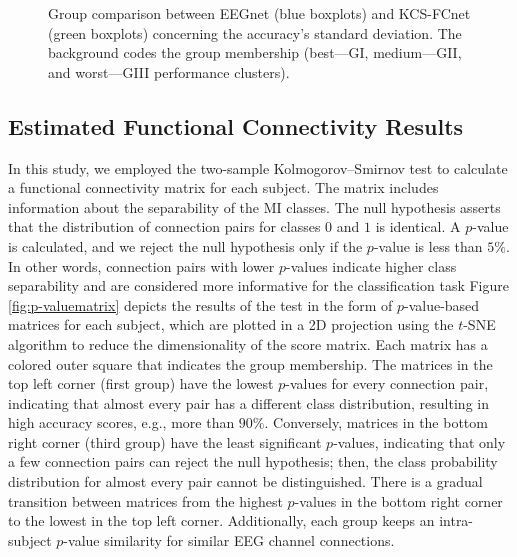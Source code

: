 \begin{figure}[h!]
    \centering
    \resizebox{0.8\linewidth}{!}{}
    \caption{Group comparison between EEGnet (blue boxplots) and KCS-FCnet (green boxplots) concerning the accuracy's standard deviation. The background codes the group membership (best---GI, medium---GII, and worst---GIII performance clusters).}\label{fig:stdcompeeggfc}
\end{figure}

\subsection{Estimated Functional Connectivity Results}
	
In this study, we employed the two-sample Kolmogorov--Smirnov test to calculate a functional connectivity matrix for each subject. The matrix includes information about the separability of the MI classes. The null hypothesis asserts that the distribution of connection pairs for classes $0$ and $1$ is identical. A $p$-value is calculated, and we reject the null hypothesis only if the $p$-value is less than $5\%$. In other words, connection pairs with lower $p$-values indicate higher class separability and are considered more informative for the classification task Figure \ref{fig:p-valuematrix} depicts the results of the test in the form of $p$-value-based matrices for each subject, which are plotted in a 2D projection using the $t$-SNE algorithm to reduce the dimensionality of the score matrix. Each matrix has a colored outer square that indicates the group membership. The matrices in the top left corner (first group) have the lowest $p$-values for every connection pair, indicating that almost every pair has a different class distribution, resulting in high accuracy scores, e.g., more than $90\%$. Conversely, matrices in the bottom right corner (third group) have the least significant $p$-values, indicating that only a few connection pairs can reject the null hypothesis; then, the class probability distribution for almost every pair cannot be distinguished. There is a gradual transition between matrices from the highest $p$-values in the bottom right corner to the lowest in the top left corner. Additionally, each group keeps an intra-subject $p$-value similarity for similar EEG channel connections.


